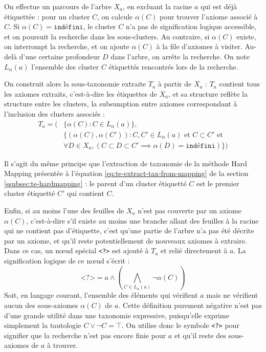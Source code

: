 On effectue un parcours de l'arbre $X_a$, en excluant la racine $a$ qui est déjà étiquettée : pour un cluster $C$, on calcule $\alpha(C)$ pour trouver l'axiome associé à $C$. Si $\alpha(C) = \texttt{indéfini}$, le cluster $C$ n'a pas de signification logique accessible, et on poursuit la recherche dans les sous-clusters. Au contraire, si $\alpha(C)$ existe, on interrompt la recherche, et on ajoute $\alpha(C)$ à la file d'axiomes à visiter. Au-delà d'une certaine profondeur $D$ dans l'arbre, on arrête la recherche. On note $L_\alpha(a)$ l'ensemble des cluster $C$ étiquettés rencontrés lors de la recherche.


On construit alors la sous-taxonomie extraite $T_a$ à partir de $X_a$ : $T_a$ contient tous les axiomes extraits, c'est-à-dire les étiquettes de $X_a$, et sa structure reflète la structure entre les clusters, la subsumption entre axiomes correspondant à l'inclusion des clusters associés :
\begin{align}
    T_a = (& \{ \alpha(C) : C \in L_\alpha(a) \}, \nonumber \\
        & \{ (\alpha(C), \alpha(C')) : C, C' \in L_\alpha(a) \textrm{ et } C \subset C' \textrm{ et} \nonumber  \\
    & \forall D \in X_a, (C \subset D \subset C' \implies \alpha(D) = \texttt{indéfini})\})
\end{align}

Il s'agit du même principe que l'extraction de taxonomie de la méthode Hard Mapping présentée à l'équation \ref{eq:te-extract-tax-from-mapping} de la section \ref{ssubsec:te-hardmapping} : le parent d'un cluster étiquetté $C$ est le premier cluster étiquetté $C'$ qui contient $C$.


Enfin, si au moins l'une des feuilles de $X_a$ n'est pas couverte par un axiome $\alpha(C)$, c'est-à-dire s'il existe au moins une branche allant des feuilles à la racine qui ne contient pas d'étiquette, c'est qu'une partie de l'arbre n'a pas été décrite par un axiome, et qu'il reste potentiellement de nouveaux axiomes à extraire. Dans ce cas, un nœud spécial \texttt{<?>} est ajouté à $T_a$ et relié directement à $a$. La signification logique de ce nœud s'écrit :
\begin{equation}
    \texttt{<?>} = a \land \left( \bigwedge\limits_{C \in L_\alpha(a)} \neg \alpha(C) \right)
    \label{eq:texp-special-node}
\end{equation}
Soit, en langage courant, l'ensemble des éléments qui vérifient $a$ mais ne vérifient aucun des sous-axiomes $\alpha(C)$ de $a$. Cette définition purement négative n'est pas d'une grande utilité dans une taxonomie expressive, puisqu'elle exprime simplement la tautologie $C \lor \neg C = \top$. On utilise donc le symbole \texttt{<?>} pour signifier que la recherche n'est pas encore finie pour $a$ et qu'il reste des sous-axiomes de $a$ à trouver.

